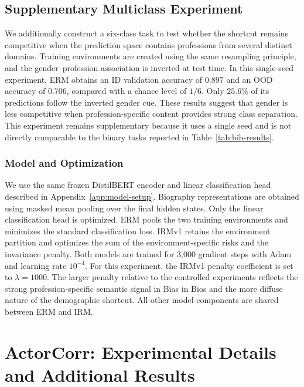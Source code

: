 \documentclass[11pt]{article}
\theoremstyle{definition}
\theoremstyle{plain}
\begin{document}
\subsection{Supplementary Multiclass Experiment}
\label{app:bib-multiclass}

We additionally construct a six-class task to test whether the shortcut remains competitive when the prediction space contains professions from several distinct domains. Training environments are created using the same resampling principle, and the gender--profession association is inverted at test time. In this single-seed experiment, ERM obtains an ID validation accuracy of $0.897$ and an OOD accuracy of $0.706$, compared with a chance level of $1/6$. Only $25.6\%$ of its predictions follow the inverted gender cue. These results suggest that gender is less competitive when profession-specific content provides strong class separation. This experiment remains supplementary because it uses a single seed and is not directly comparable to the binary tasks reported in Table~\ref{tab:bib-results}.


\subsubsection{Model and Optimization}
\label{app:bib-optimization}

We use the same frozen DistilBERT encoder and linear classification head described in Appendix~\ref{app:model-setup}. Biography representations are obtained using masked mean pooling over the final hidden states. Only the linear classification head is optimized. ERM pools the two training environments and minimizes the standard classification loss. IRMv1 retains the environment partition and optimizes the sum of the environment-specific risks and the invariance penalty. Both models are trained for 3,000 gradient steps with Adam and learning rate $10^{-4}$. For this experiment, the IRMv1 penalty coefficient is set to $\lambda=1000$. The larger penalty relative to the controlled experiments reflects the strong profession-specific semantic signal in Bias in Bios and the more diffuse nature of the demographic shortcut. All other model components are shared between ERM and IRM.


\section{ActorCorr: Experimental Details and Additional Results}
\label{app:actorcorr-details}
\end{document}
